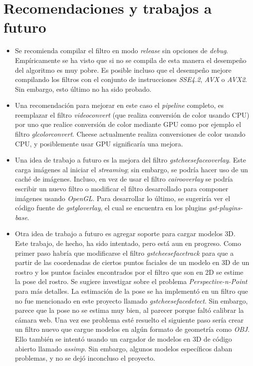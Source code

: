 \documentclass[a4paper,openright,12pt]{report}
\begin{document}
\section{Recomendaciones y trabajos a futuro}
  \begin{itemize}
    \item
      Se recomienda compilar el filtro en modo \textit{release} sin opciones de
      \textit{debug}. Empíricamente se ha visto que si no se compila de esta
      manera el desempeño del algoritmo es muy pobre. Es posible incluso que el
      desempeño mejore compilando los filtros con el conjunto de instrucciones
      \textit{SSE4.2}, \textit{AVX} o \textit{AVX2}. Sin embargo, esto último no
      ha sido probado.
    \item
      Una recomendación para mejorar en este caso el \textit{pipeline} completo,
      es reemplazar el filtro \textit{videoconvert} (que realiza conversión de
      color usando CPU) por uno que realice conversión de color mediante GPU
      como por ejemplo el filtro \textit{glcolorconvert}. Cheese actualmente
      realiza conversiones de color usando CPU, y posiblemente usar GPU
      significaría una mejora.
    \item
      Una idea de trabajo a futuro es la mejora del filtro
      \textit{gstcheesefaceoverlay}. Este carga imágenes al iniciar el
      \textit{streaming}; sin embargo, se podría hacer uso de un caché de
      imágenes. Incluso, en vez de usar el filtro \textit{cairooverlay} se
      podría escribir un nuevo filtro o modificar el filtro desarrollado para
      componer imágenes usando \textit{OpenGL}. Para desarrollar lo último, se
      sugeriría ver el código fuente de \textit{gstgloverlay}, el cual se
      encuentra en los plugins \textit{gst-plugins-base}.
    \item
      Otra idea de trabajo a futuro es agregar soporte para cargar modelos 3D.
      Este trabajo, de hecho, ha sido intentado, pero está aun en progreso. Como
      primer paso habría que modificarse el filtro \textit{gstcheesefacetrack}
      para que a partir de las coordenadas de ciertos puntos faciales de un
      modelo en 3D de un rostro y los puntos faciales encontrados por el filtro
      que son en 2D se estime la pose del rostro. Se sugiere investigar sobre el
      problema \textit{Perspective-n-Point} para más detalles. La estimación de
      la pose se ha implementó en un filtro que no fue mencionado en este proyecto
      llamado \textit{gstcheesefacedetect}. Sin embargo, parece que la pose no
      se estima muy bien, al parecer porque faltó calibrar la cámara web.
      Una vez ese problema esté resuelto el siguiente paso sería crear un filtro
      nuevo que cargue modelos en algún formato de geometría como \textit{OBJ}.
      Ello también se intentó usando un cargador de modelos en 3D de código
      abierto llamado \textit{assimp}. Sin embargo, algunos modelos específicos
      daban problemas, y no se dejó inconcluso el proyecto.
  \end{itemize}

{}
\end{document}

